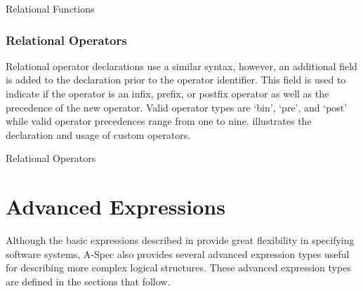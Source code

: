 \documentclass[letterpaper,10pt,draft]{book}
\begin{document}
\begin{example}
\begin{minipage}[t]{0.49\linewidth}
   
\end{minipage}
\begin{minipage}[t]{0.49\linewidth}
   \azbox
   
\end{minipage}

   \caption{Relational Functions}
   \label{ex:RelFunc}
\end{example}

\subsubsection{Relational Operators}
   \label{sect:PredOp}

Relational operator declarations use a similar syntax, however, an additional field
is added to the declaration prior to the operator identifier.  This field is used
to indicate if the operator is an infix, prefix, or postfix operator as well as
the precedence of the new operator.  Valid operator types are `bin', `pre', and
`post' while valid operator precedences range from one to nine.  
illustrates the declaration and usage of custom operators.

\begin{example}
\begin{minipage}[t]{0.49\linewidth}
   
\end{minipage}
\begin{minipage}[t]{0.49\linewidth}
   \azbox
   
\end{minipage}

   \caption{Relational Operators}
   \label{ex:RelOp}
\end{example}

\section{Advanced Expressions}
   \label{sect:AdvExpr}

Although the basic expressions described in  provide great
flexibility in specifying software systems, A-Spec also provides several advanced
expression types useful for describing more complex logical structures.  These advanced
expression types are defined in the sections that follow.
\end{document}
